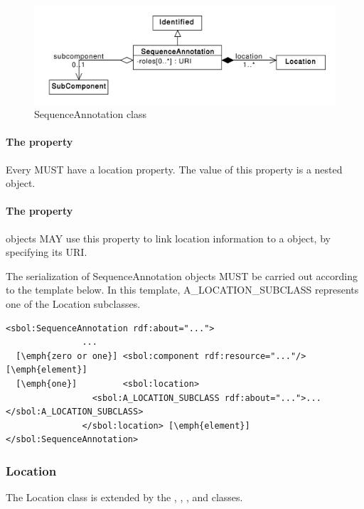 \begin{figure}[ht]
\begin{center}
\includegraphics[scale=0.6]{uml/sequence_annotation}
\caption[]{SequenceAnnotation class}
\label{uml:sequence_annotation}
\end{center}
\end{figure}

\paragraph{The  property}
Every  MUST have a location property. The value of this property is a nested  object.

\paragraph{The  property}
 objects MAY use this property to link location information to a  object, by specifying its URI.


The serialization of SequenceAnnotation objects MUST be carried out according to the template below. In this template, A\_LOCATION\_SUBCLASS represents one of the Location subclasses.
\begin{lstlisting}
<sbol:SequenceAnnotation rdf:about="...">
               ...   
  [\emph{zero or one}] <sbol:component rdf:resource="..."/> [\emph{element}] 
  [\emph{one}]         <sbol:location>
                 <sbol:A_LOCATION_SUBCLASS rdf:about="...">...</sbol:A_LOCATION_SUBCLASS>
               </sbol:location> [\emph{element}] 
</sbol:SequenceAnnotation>
\end{lstlisting}




\subsubsection{Location}
\label{sec:Location}
The Location class is extended by the , , , and  classes.


